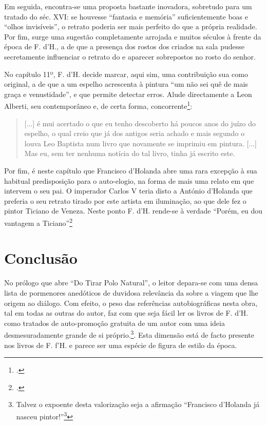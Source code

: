 \documentclass{article}
\begin{document}
Em seguida, encontra-se uma proposta bastante inovadora, sobretudo
para um tratado do séc. XVI: se houvesse ``fantasia e memória''
suficientemente boas e ``olhos invisíveis'', o retrato poderia ser
mais perfeito do que a própria realidade. Por fim, surge uma sugestão
completamente arrojada e muitos séculos à frente da época de F. d'H.,
a de que a presença dos rostos dos criados na sala pudesse
secretamente influenciar o retrato do e aparecer sobrepostos no rosto
do senhor.

No capítulo 11º, F. d'H. decide marcar, aqui sim, uma contribuição sua
como original, a de que a um espelho acrescenta à pintura ``um não sei
quê de mais graça e venustidade'', e que permite detectar erros. Alude
directamente a Leon Alberti, seu contemporâneo e, de certa forma,
concorrente\footcite[p.41]{holanda}:

\begin{quote}
  [...] é mui acertado o que eu tenho descoberto há poucos anos do
  juízo do espelho, o qual creio que já dos antigos seria achado e
  mais segundo o louva Leo Baptista num livro que novamente se
  imprimiu em pintura. [...] Mas eu, sem ter nenhuma notícia do tal
  livro, tinha já escrito este.
\end{quote}

Por fim, é neste capítulo que Francisco d'Holanda abre uma rara
excepção à sua habitual predisposição para o auto-elogio, na forma de
mais uma relato em que intervem o seu pai. O imperador Carlos V teria
disto a António d'Holanda que preferia o seu retrato tirado por este
artista em iluminação, ao que dele fez o pintor Ticiano de
Veneza. Neste ponto F. d'H. rende-se à verdade ``Porém, eu dou
vantagem a Ticiano''\footcite[p.42]{holanda}

\section{Conclusão}

No prólogo que abre ``Do Tirar Polo Natural'', o leitor depara-se com
uma densa lista de pormenores anedóticos de duvidosa relevância da
sobre a viagem que lhe origem ao diálogo. Com efeito, o peso das
referências autobiográficas nesta obra, tal em todas as outras do
autor, faz com que seja fácil ler os livros de F. d'H. como tratados
de auto-promoção gratuita de um autor com uma ideia desmesuradamente
grande de si próprio.\footnote{Talvez o expoente desta valorização
  seja a afirmação ``Francisco d'Holanda já nasceu
  pintor!''\footcite{teresa-desenho}}. Esta dimensão está de facto
presente nos livros de F. f'H. e parece ser uma espécie de figura de
estilo da época.
\end{document}
